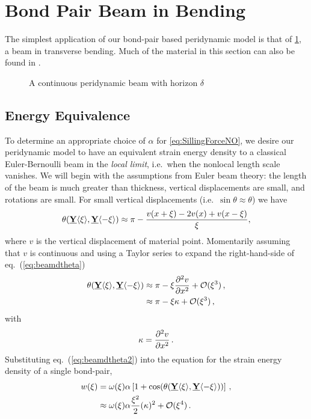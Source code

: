 \section{Bond Pair Beam in Bending}
\label{sec:BPbeam}
The simplest application of our bond-pair based peridynamic model is that of \cref{fig:continuousbeam}, a beam in transverse bending.
Much of the material in this section can also be found in \cite{ogrady2014beams}.
%
\begin{figure}[h]
  \centering
{}
\caption{A continuous peridynamic beam with horizon $\delta$}
\label{fig:continuousbeam}
\end{figure}
%

\subsection{Energy Equivalence}
\label{sec:beamEnergy}
To determine an appropriate choice of $\alpha$ for \cref{eq:SillingForceNO}, we desire our peridynamic model to have an equivalent strain energy density to a classical Euler-Bernoulli beam in the \emph{local limit}, i.e.\ when the nonlocal length scale vanishes.  We will begin with the assumptions from Euler beam theory: the length of the beam is much greater than thickness, vertical displacements are small, and rotations are small. For small vertical displacements (i.e.\ $\sin{\theta} \approx \theta$) we have
%
\begin{equation}
\theta(\vstate{Y}{}{\xi},\vstate{Y}{}{\mathbf{-\xi}}) \approx \pi-\frac{v(x+\xi)-2v(x)+v(x-\xi)}{\xi},
\label{eq:beamdtheta}
\end{equation}
%
where $v$ is the vertical displacement of material point.  Momentarily assuming that $v$ is continuous and using a Taylor series to expand the right-hand-side of eq.~(\ref{eq:beamdtheta})  
%
\begin{align}
\theta(\vstate{Y}{}{\xi},\vstate{Y}{}{\mathbf{-\xi}}) &\approx \pi-\xi \frac{\partial^2 v}{\partial x^2}+\mathcal{O}(\xi^3)\, , \notag \\
&\approx  \pi-\xi \kappa +\mathcal{O}(\xi^3)\,,
\label{eq:beamdtheta2}
\end{align}
with
\begin{equation}
\kappa = \frac{\partial^2 v}{\partial x^2}\, .\notag
\end{equation}
%
Substituting eq.~(\ref{eq:beamdtheta2}) into the equation for the strain energy density of a single bond-pair,
%
\begin{align}
\label{eq:continuousBeamw}
w(\xi) &= \omega(\xi) \alpha \left[1+\cos(\theta(\vstate{Y}{}{\xi},\vstate{Y}{}{\mathbf{-\xi}})) \right]\, , \notag\\
&\approx \omega(\xi) \alpha\frac{\xi^2}{2}(\kappa)^2 +\mathcal{O}(\xi^4)\, .\notag
\end{align}
